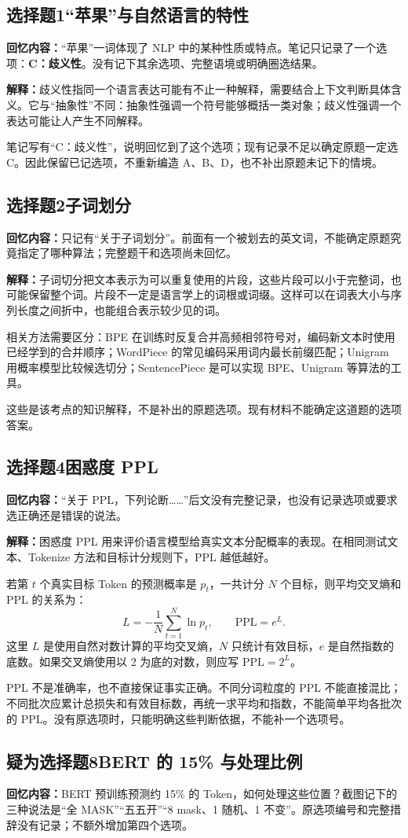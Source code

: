 \documentclass[UTF8,a4paper,zihao=-4,fontset=windows]{ctexart}
\newcommand{\recalled}[1]{\Needspace{8\baselineskip}\subsection*{#1}}
\begin{document}
\recalled{选择题1\quad “苹果”与自然语言的特性}
\textbf{回忆内容：}“苹果”一词体现了 NLP 中的某种性质或特点。笔记只记录了一个选项：\textbf{C：歧义性}。没有记下其余选项、完整语境或明确圈选结果。

\textbf{解释：}歧义性指同一个语言表达可能有不止一种解释，需要结合上下文判断具体含义。它与“抽象性”不同：抽象性强调一个符号能够概括一类对象；歧义性强调一个表达可能让人产生不同解释。

笔记写有“C：歧义性”，说明回忆到了这个选项；现有记录不足以确定原题一定选 C。因此保留已记选项，不重新编造 A、B、D，也不补出原题未记下的情境。

\recalled{选择题2\quad 子词划分}
\textbf{回忆内容：}只记有“关于子词划分”。前面有一个被划去的英文词，不能确定原题究竟指定了哪种算法；完整题干和选项尚未回忆。

\textbf{解释：}子词切分把文本表示为可以重复使用的片段，这些片段可以小于完整词，也可能保留整个词。片段不一定是语言学上的词根或词缀。这样可以在词表大小与序列长度之间折中，也能组合表示较少见的词。

相关方法需要区分：BPE 在训练时反复合并高频相邻符号对，编码新文本时使用已经学到的合并顺序；WordPiece 的常见编码采用词内最长前缀匹配；Unigram 用概率模型比较候选切分；SentencePiece 是可以实现 BPE、Unigram 等算法的工具。

这些是该考点的知识解释，不是补出的原题选项。现有材料不能确定这道题的选项答案。

\recalled{选择题4\quad 困惑度 PPL}
\textbf{回忆内容：}“关于 PPL，下列论断……”后文没有完整记录，也没有记录选项或要求选正确还是错误的说法。

\textbf{解释：}困惑度 PPL 用来评价语言模型给真实文本分配概率的表现。在相同测试文本、Tokenize 方法和目标计分规则下，PPL 越低越好。

若第 $t$ 个真实目标 Token 的预测概率是 $p_t$，一共计分 $N$ 个目标，则平均交叉熵和 PPL 的关系为：
\[
L=-\frac1N\sum_{t=1}^{N}\ln p_t,\qquad \mathrm{PPL}=e^L.
\]
这里 $L$ 是使用自然对数计算的平均交叉熵，$N$ 只统计有效目标，$e$ 是自然指数的底数。如果交叉熵使用以 2 为底的对数，则应写 $\mathrm{PPL}=2^L$。

PPL 不是准确率，也不直接保证事实正确。不同分词粒度的 PPL 不能直接混比；不同批次应累计总损失和有效目标数，再统一求平均和指数，不能简单平均各批次的 PPL。没有原选项时，只能明确这些判断依据，不能补一个选项号。

\recalled{疑为选择题8\quad BERT 的 15\% 与处理比例}
\textbf{回忆内容：}BERT 预训练预测约 15\% 的 Token，如何处理这些位置？截图记下的三种说法是“全 MASK”“五五开”“8 mask、1 随机、1 不变”。原选项编号和完整措辞没有记录；不额外增加第四个选项。
\end{document}

